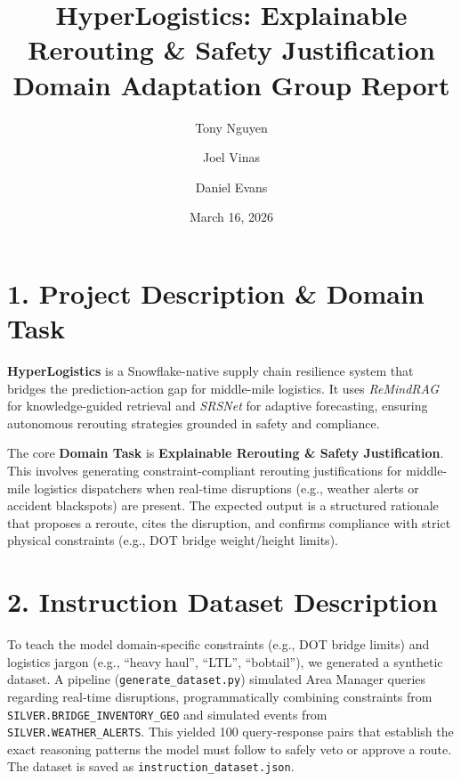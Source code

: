 \documentclass[11pt,a4paper]{article}
\title{\vspace{-2em}\textbf{HyperLogistics: Explainable Rerouting \& Safety Justification}\\
\large Domain Adaptation Group Report}
\author{Tony Nguyen \and Joel Vinas \and Daniel Evans}
\date{March 16, 2026}
\begin{document}
\maketitle

\section*{1. Project Description \& Domain Task}
\textbf{HyperLogistics} is a Snowflake-native supply chain resilience system that bridges the prediction-action gap for middle-mile logistics. It uses \textit{ReMindRAG} for knowledge-guided retrieval and \textit{SRSNet} for adaptive forecasting, ensuring autonomous rerouting strategies grounded in safety and compliance.

The core \textbf{Domain Task} is \textbf{Explainable Rerouting \& Safety Justification}. This involves generating constraint-compliant rerouting justifications for middle-mile logistics dispatchers when real-time disruptions (e.g., weather alerts or accident blackspots) are present. The expected output is a structured rationale that proposes a reroute, cites the disruption, and confirms compliance with strict physical constraints (e.g., DOT bridge weight/height limits).

\section*{2. Instruction Dataset Description}
To teach the model domain-specific constraints (e.g., DOT bridge limits) and logistics jargon (e.g., ``heavy haul'', ``LTL'', ``bobtail''), we generated a synthetic dataset. 
A pipeline (\texttt{generate\_dataset.py}) simulated Area Manager queries regarding real-time disruptions, programmatically combining constraints from \texttt{SILVER.BRIDGE\_INVENTORY\_GEO} and simulated events from \texttt{SILVER.WEATHER\_ALERTS}. This yielded 100 query-response pairs that establish the exact reasoning patterns the model must follow to safely veto or approve a route. The dataset is saved as \texttt{instruction\_dataset.json}.
\end{document}
